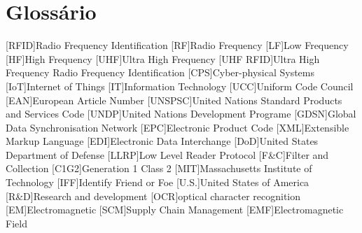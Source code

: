 \chapter{Glossário}

\footnotesize
\SingleSpacing

\begin{multicols}{2}
\begin{acronym}[AAAAAA]

	[RFID]{Radio Frequency Identification}
	[RF]{Radio Frequency}
	[LF]{Low Frequency}
	[HF]{High Frequency}
	[UHF]{Ultra High Frequency}
	[UHF RFID]{Ultra High Frequency Radio Frequency Identification}
	[CPS]{Cyber-physical Systems}
	[IoT]{Internet of Things}
	[IT]{Information Technology}
	[UCC]{Uniform Code Council}
	[EAN]{European Article Number}
	[UNSPSC]{United Nations Standard Products and Services Code}
	[UNDP]{United Nations Development Programe}
	[GDSN]{Global Data Synchronisation Network}
	[EPC]{Electronic Product Code}
	[XML]{Extensible Markup Language}
	[EDI]{Electronic Data Interchange}
	[DoD]{United States Department of Defense}
	[LLRP]{Low Level Reader Protocol}
	[F\&C]{Filter and Collection}
	[C1G2]{Generation 1 Class 2}
	[MIT]{Massachusetts Institute of Technology}
	[IFF]{Identify Friend or Foe}
	[U.S.]{United States of America}
	[R\&D]{Research and development}
	[OCR]{optical character recognition}
	[EM]{Electromagnetic}
	[SCM]{Supply Chain Management}
	[EMF]{Electromagnetic Field}

\end{acronym}
\end{multicols}

